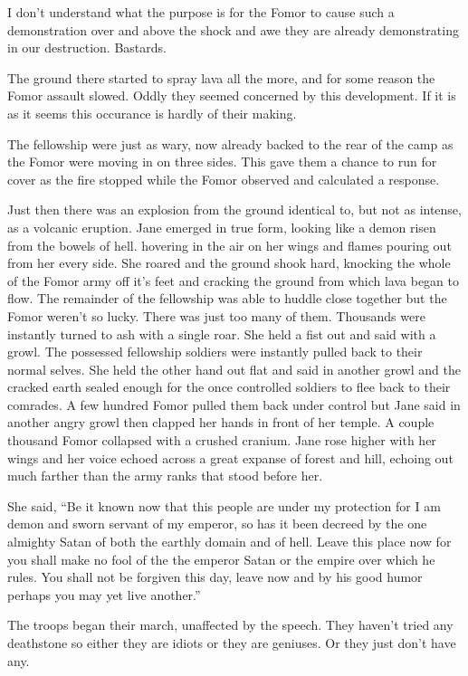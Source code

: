 I don't understand what the purpose is for the Fomor to cause such a demonstration over and above the shock and awe they are already demonstrating in our destruction. Bastards.

The ground there started to spray lava all the more, and for some reason the Fomor assault slowed. Oddly they seemed concerned by this development. If it is as it seems this occurance is hardly of their making.

The fellowship were just as wary, now already backed to the rear of the camp as the Fomor were moving in on three sides. This gave them a chance to run for cover as the fire stopped while the Fomor observed and calculated a response.

Just then there was an explosion from the ground identical to, but not as intense, as a volcanic eruption. Jane emerged in true form, looking like a demon risen from the bowels of hell. hovering in the air on her wings and flames pouring out from her every side. She roared and the ground shook hard, knocking the whole of the Fomor army off it's feet and cracking the ground from which lava began to flow. The remainder of the fellowship was able to huddle close together but the Fomor weren't so lucky. There was just too many of them. Thousands were instantly turned to ash with a single roar. She held a fist out and said \enochianxx with a growl. The possessed fellowship soldiers were instantly pulled back to their normal selves. She held the other hand out flat and said \encohianxx in another growl and the cracked earth sealed enough for the once controlled soldiers to flee back to their comrades. A few hundred Fomor pulled them back under control but Jane said \enochianxx in another angry growl then clapped her hands in front of her temple. A couple thousand Fomor collapsed with a crushed cranium. Jane rose higher with her wings and her voice echoed across a great expanse of forest and hill, echoing out much farther than the army ranks that stood before her.

She said, ``Be it known now that this people are under my protection for I am demon and sworn servant of my emperor, so has it been decreed by the one almighty Satan of both the earthly domain and of hell. Leave this place now for you shall make no fool of the the emperor Satan or the empire over which he rules. You shall not be forgiven this day, leave now and by his good humor perhaps you may yet live another.''

The troops began their march, unaffected by the speech. They haven't tried any deathstone so either they are idiots or they are geniuses. Or they just don't have any.

